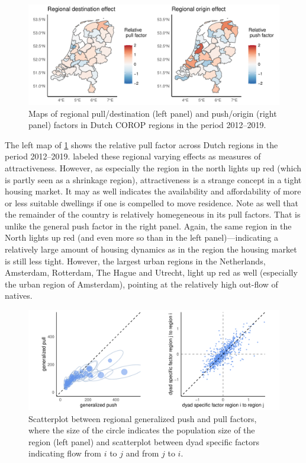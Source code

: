 \documentclass[11pt,parskip,abstracton,notitlepage, dvipsnames]{scrartcl}
\begin{document}
\begin{figure}[ht]\centering %
  \includegraphics[width=1.0\linewidth]{./../../fig/attractivity_region.pdf}
  \caption{Maps of regional pull/destination (left panel) and push/origin (right panel) factors in Dutch COROP regions in the period 2012--2019.}
  \label{fig:attractivity}
\end{figure}

The left map of \ref{fig:attractivity} shows the relative pull factor across Dutch regions in the period 2012--2019. \citet{congdon2010random} labeled these regional varying effects as measures of attractiveness. However, as especially the region in the north lights up red (which is partly seen as a shrinkage region), attractiveness is a strange concept in a tight housing market. It may as well indicates the availability and affordability of more or less suitable dwellings if one is compelled to move residence. Note as well that the remainder of the country is relatively homegeneous in its pull factors. That is unlike the general push factor in the right panel. Again, the same region in the North lights up red (and even more so than in the left panel)---indicating a relatively large amount of housing dynamics as in the region the housing market is still less tight. However, the largest urban regions in the Netherlands, Amsterdam, Rotterdam, The Hague and Utrecht, light up red as well (especially the urban region of Amsterdam), pointing at the relatively high out-flow of natives. 

\begin{figure}[ht]\centering %
  \includegraphics[width=1.0\linewidth]{./../../fig/country_dyad.pdf}
  \caption{Scatterplot between regional generalized push and pull factors, where the size of the circle indicates the population size of the region  (left panel) and scatterplot between dyad specific factors indicating flow from $i$ to $j$ and from $j$ to $i$.}
  \label{fig:correlation}
\end{figure}
\end{document}
